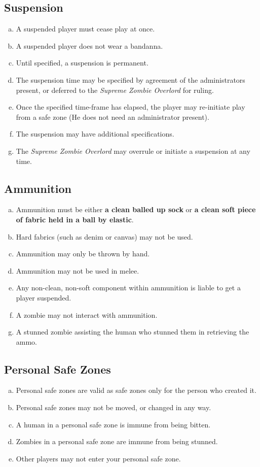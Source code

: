\documentclass[a4paper,12pt]{article}
\begin{document}
\subsection{Suspension}

\begin{enumerate}[(a)]
    \item A suspended player must cease play at once.
    \item A suspended player does not wear a bandanna.
    \item Until specified, a suspension is permanent.
    \item The suspension time may be specified by agreement of the administrators present, or deferred to the \emph{Supreme Zombie Overlord} for ruling.
    \item Once the specified time-frame has elapsed, the player may re-initiate play from a safe zone (He does not need an administrator present).
    \item The suspension may have additional specifications.
    \item The \emph{Supreme Zombie Overlord} may overrule or initiate a suspension at any time. 
\end{enumerate}

\subsection{Ammunition}
\begin{enumerate}[(a)]
    \item Ammunition must be either {\bf a clean balled up sock} or {\bf a clean soft piece of fabric held in a ball by elastic}.
    \item Hard fabrics (such as denim or canvas) may not be used.
    \item Ammunition may only be thrown by hand.
    \item Ammunition may not be used in melee.
    \item Any non-clean, non-soft component within ammunition is liable to get a player suspended.
    \item A zombie may not interact with ammunition. 
    \item A stunned zombie assisting the human who stunned them in retrieving the ammo.
\end{enumerate}

\subsection{Personal Safe Zones}
\begin{enumerate}[(a)]
    \item Personal safe zones are valid as safe zones only for the person who created it.
    \item Personal safe zones may not be moved, or changed in any way.
    \item A human in a personal safe zone is immune from being bitten.
    \item Zombies in a personal safe zone are immune from being stunned.
    \item Other players may not enter your personal safe zone.
\end{enumerate} 
\end{document}
